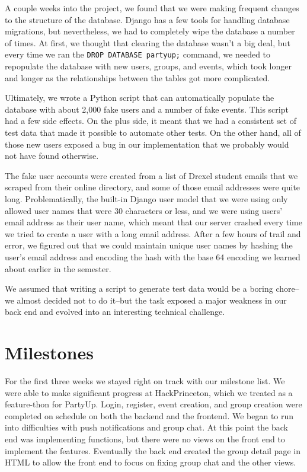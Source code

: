 \documentclass[12pt]{article}
\begin{document}
A couple weeks into the project, we found that we were making frequent changes to the structure of the database.
Django has a few tools for handling database migrations,
but nevertheless, we had to completely wipe the database a number of times.
At first, we thought that clearing the database wasn't a big deal, but
every time we ran the \texttt{DROP DATABASE partyup;} command,
we needed to repopulate the database with new users, groups, and events,
which took longer and longer as the relationships between the tables got more complicated.

Ultimately, we wrote a Python script that can automatically populate the database with
about 2,000 fake users and a number of fake events.
This script had a few side effects.
On the plus side, it meant that we had a consistent set of test data that made it
possible to automate other tests.
On the other hand, all of those new users exposed a bug in our implementation that we 
probably would not have found otherwise.

The fake user accounts were created from a list of Drexel student emails that
we scraped from their online directory,
and some of those email addresses were quite long.
Problematically, the built-in Django user model that we were using only allowed
user names that were 30 characters or less, and
we were using users' email address as their user name,
which meant that our server crashed every time we tried to create a user with a long email address.
After a few hours of trail and error, we figured out that we could maintain unique user names
by hashing the user's email address and encoding the hash with the base 64 encoding we learned
about earlier in the semester.

We assumed that writing a script to generate test data would be a boring chore--we almost decided not to do
it--but the task exposed a major weakness in our back end and evolved into an interesting technical challenge.

\section{Milestones}

For the first three weeks we stayed right on track with our milestone list. 
We were able to make significant progress at HackPrinceton, which we treated as a feature-thon for PartyUp. 
Login, register, event creation, and group creation were completed on schedule on both the backend and the frontend. 
We began to run into difficulties with push notifications and group chat. 
At this point the back end was implementing functions, but there were no views on the front end to implement the features. 
Eventually the back end created the group detail page in HTML to allow the front end to focus on fixing group chat and the other views. 
\end{document}
